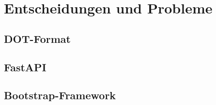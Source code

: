\section{Entscheidungen und Probleme}\label{sec:entscheidungenundprobleme}

\subsection{DOT-Format}

\subsection{FastAPI}

\subsection{Bootstrap-Framework}